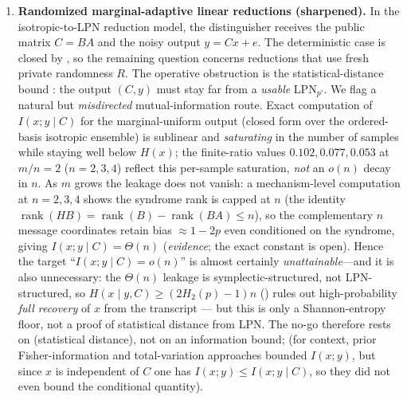 \documentclass[11pt,a4paper]{article}
\theoremstyle{plain}
\theoremstyle{definition}
\begin{document}
\begin{enumerate}
it is open (\emph{evidence}: the $n=2$ enumeration and the elementary $W(g)=\Theta(n)$; \emph{conjecture}: that no usable intermediate~$H$ or correction exists).

\item \textbf{Randomized marginal-adaptive linear reductions (sharpened).} \label{open:marginal-adaptive} In the isotropic-to-LPN reduction model, the distinguisher receives the public matrix $C=BA$ and the noisy output $y=Cx+e$. The deterministic case is closed by , so the remaining question concerns reductions that use fresh private randomness $R$. The operative obstruction is the statistical-distance bound : the output $(C,y)$ must stay far from a \emph{usable} $\mathrm{LPN}_{p'}$. We flag a natural but \emph{misdirected} mutual-information route. Exact computation of $I(x;y\mid C)$ for the marginal-uniform output (closed form over the ordered-basis isotropic ensemble) is sublinear and \emph{saturating} in the number of samples while staying well below $H(x)$; the finite-ratio values $0.102,0.077,0.053$ at $m/n=2$ ($n=2,3,4$) reflect this per-sample saturation, \emph{not} an $o(n)$ decay in $n$. As $m$ grows the leakage does not vanish: a mechanism-level computation at $n=2,3,4$ shows the syndrome rank is capped at $n$ (the identity $\operatorname{rank}(HB)=\operatorname{rank}(B)-\operatorname{rank}(BA)\le n$), so the complementary $n$ message coordinates retain bias $\approx 1-2p$ even conditioned on the syndrome, giving $I(x;y\mid C)=\Theta(n)$ (\emph{evidence}; the exact constant is open). Hence the target ``$I(x;y\mid C)=o(n)$'' is almost certainly \emph{unattainable}---and it is also unnecessary: the $\Theta(n)$ leakage is symplectic-structured, not LPN-structured, so $H(x\mid y,C)\ge(2H_2(p)-1)n$ () rules out high-probability \emph{full recovery} of $x$ from the transcript --- but this is only a Shannon-entropy floor, not a proof of statistical distance from LPN. The no-go therefore rests on  (statistical distance), not on an information bound; (for context, prior Fisher-information and total-variation approaches bounded $I(x;y)$, but since $x$ is independent of $C$ one has $I(x;y)\le I(x;y\mid C)$, so they did not even bound the conditional quantity).


\end{enumerate}
\end{document}
